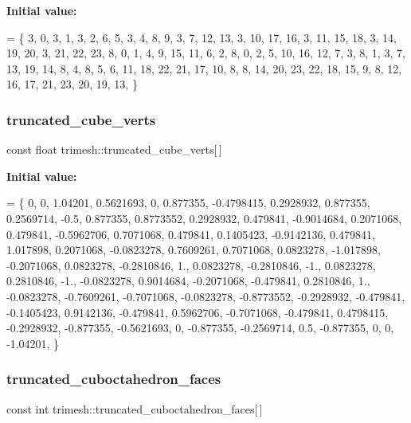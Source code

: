 {\bfseries Initial value\+:}
\begin{DoxyCode}
= \{
    3, 0, 3, 1,
    3, 2, 6, 5,
    3, 4, 8, 9,
    3, 7, 12, 13,
    3, 10, 17, 16,
    3, 11, 15, 18,
    3, 14, 19, 20,
    3, 21, 22, 23,
    8, 0, 1, 4, 9, 15, 11, 6, 2,
    8, 0, 2, 5, 10, 16, 12, 7, 3,
    8, 1, 3, 7, 13, 19, 14, 8, 4,
    8, 5, 6, 11, 18, 22, 21, 17, 10,
    8, 8, 14, 20, 23, 22, 18, 15, 9,
    8, 12, 16, 17, 21, 23, 20, 19, 13,
\}
\end{DoxyCode}
\mbox{\label{namespacetrimesh_ad28438f14f0ad2e00724e7aa237bc42a}} 
\subsubsection{\texorpdfstring{truncated\+\_\+cube\+\_\+verts}{truncated\_cube\_verts}}
{\footnotesize\ttfamily const float trimesh\+::truncated\+\_\+cube\+\_\+verts\mbox{[}$\,$\mbox{]}\hspace{0.3cm}{\ttfamily [static]}}

{\bfseries Initial value\+:}
\begin{DoxyCode}
= \{
    0, 0, 1.04201,
    0.5621693, 0, 0.877355,
    -0.4798415, 0.2928932, 0.877355,
    0.2569714, -0.5, 0.877355,
    0.8773552, 0.2928932, 0.479841,
    -0.9014684, 0.2071068, 0.479841,
    -0.5962706, 0.7071068, 0.479841,
    0.1405423, -0.9142136, 0.479841,
    1.017898, 0.2071068, -0.0823278,
    0.7609261, 0.7071068, 0.0823278,
    -1.017898, -0.2071068, 0.0823278,
    -0.2810846, 1., 0.0823278,
    -0.2810846, -1., 0.0823278,
    0.2810846, -1., -0.0823278,
    0.9014684, -0.2071068, -0.479841,
    0.2810846, 1., -0.0823278,
    -0.7609261, -0.7071068, -0.0823278,
    -0.8773552, -0.2928932, -0.479841,
    -0.1405423, 0.9142136, -0.479841,
    0.5962706, -0.7071068, -0.479841,
    0.4798415, -0.2928932, -0.877355,
    -0.5621693, 0, -0.877355,
    -0.2569714, 0.5, -0.877355,
    0, 0, -1.04201,
\}
\end{DoxyCode}
\mbox{\label{namespacetrimesh_a65ac2f53881b8f240346cff7fe0d9631}} 
\subsubsection{\texorpdfstring{truncated\+\_\+cuboctahedron\+\_\+faces}{truncated\_cuboctahedron\_faces}}
{\footnotesize\ttfamily const int trimesh\+::truncated\+\_\+cuboctahedron\+\_\+faces\mbox{[}$\,$\mbox{]}\hspace{0.3cm}{\ttfamily [static]}}

